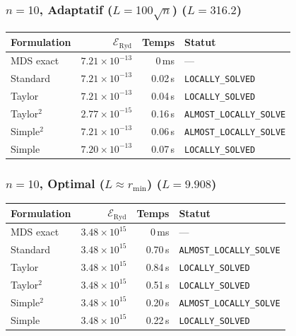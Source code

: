 \subsubsection{$n=10$, Adaptatif ($L{=}100\sqrt{n}$) ($L=316.2$)}
\begin{longtable}{@{}lrrl@{}}
  \toprule
  Formulation & $\mathcal{E}_{\mathrm{Ryd}}$ & Temps & Statut \\
  \midrule
  \endhead
  MDS exact & $7.21\times10^{-13}$ & 0\,ms & --- \\
  Standard & $7.21\times10^{-13}$ & 0.02\,s & \texttt{LOCALLY\_SOLVED} \\
  Taylor & $7.21\times10^{-13}$ & 0.04\,s & \texttt{LOCALLY\_SOLVED} \\
  Taylor$^2$ & $2.77\times10^{-15}$ & 0.16\,s & \texttt{ALMOST\_LOCALLY\_SOLVE} \\
  Simple$^2$ & $7.21\times10^{-13}$ & 0.06\,s & \texttt{ALMOST\_LOCALLY\_SOLVE} \\
  Simple & $7.20\times10^{-13}$ & 0.07\,s & \texttt{LOCALLY\_SOLVED} \\
  \bottomrule
\end{longtable}

\subsubsection{$n=10$, Optimal ($L{\approx}r_{\min}$) ($L=9.908$)}
\begin{longtable}{@{}lrrl@{}}
  \toprule
  Formulation & $\mathcal{E}_{\mathrm{Ryd}}$ & Temps & Statut \\
  \midrule
  \endhead
  MDS exact & $3.48\times10^{15}$ & 0\,ms & --- \\
  Standard & $3.48\times10^{15}$ & 0.70\,s & \texttt{ALMOST\_LOCALLY\_SOLVE} \\
  Taylor & $3.48\times10^{15}$ & 0.84\,s & \texttt{LOCALLY\_SOLVED} \\
  Taylor$^2$ & $3.48\times10^{15}$ & 0.51\,s & \texttt{LOCALLY\_SOLVED} \\
  Simple$^2$ & $3.48\times10^{15}$ & 0.20\,s & \texttt{ALMOST\_LOCALLY\_SOLVE} \\
  Simple & $3.48\times10^{15}$ & 0.22\,s & \texttt{LOCALLY\_SOLVED} \\
  \bottomrule
\end{longtable}

